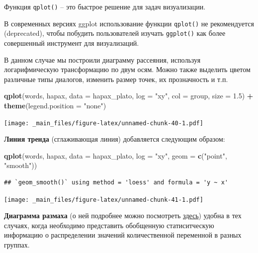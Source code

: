 \documentclass[
]{book}
\newenvironment{Shaded}{\begin{snugshade}}{\end{snugshade}}
\newcommand{\AttributeTok}[1]{\textcolor[rgb]{0.13,0.29,0.53}{#1}}
\newcommand{\FloatTok}[1]{\textcolor[rgb]{0.00,0.00,0.81}{#1}}
\newcommand{\FunctionTok}[1]{\textcolor[rgb]{0.13,0.29,0.53}{\textbf{#1}}}
\newcommand{\NormalTok}[1]{#1}
\newcommand{\SpecialCharTok}[1]{\textcolor[rgb]{0.81,0.36,0.00}{\textbf{#1}}}
\newcommand{\StringTok}[1]{\textcolor[rgb]{0.31,0.60,0.02}{#1}}
\theoremstyle{definition}
\theoremstyle{definition}
\theoremstyle{definition}
\theoremstyle{definition}
\theoremstyle{remark}
\begin{document}
Функция \texttt{qplot()} -- это быстрое решение для задач визуализации.

В современных версиях ggplot использование функции \texttt{qplot()} не рекомендуется (deprecated), чтобы побудить пользователей изучать \texttt{ggplot()} как более совершенный инструмент для визуализаций.

В данном случае мы построили диаграмму рассеяния, используя логарифмическую трансформацию по двум осям. Можно также выделить цветом различные типы диалогов, изменить размер точек, их прозначность и т.п.

\begin{Shaded}
\begin{Highlighting}[]
\FunctionTok{qplot}\NormalTok{(words, hapax, }\AttributeTok{data =}\NormalTok{ hapax\_plato, }\AttributeTok{log =} \StringTok{"xy"}\NormalTok{, }\AttributeTok{col =}\NormalTok{ group, }\AttributeTok{size =} \FloatTok{1.5}\NormalTok{) }\SpecialCharTok{+} \FunctionTok{theme}\NormalTok{(}\AttributeTok{legend.position =} \StringTok{"none"}\NormalTok{)}
\end{Highlighting}
\end{Shaded}

\texttt{[image: \_main\_files/figure-latex/unnamed-chunk-40-1.pdf]}

\textbf{Линия тренда} (сглаживающая линия) добавляется следующим образом:

\begin{Shaded}
\begin{Highlighting}[]
\FunctionTok{qplot}\NormalTok{(words, hapax, }\AttributeTok{data =}\NormalTok{ hapax\_plato, }\AttributeTok{log =} \StringTok{"xy"}\NormalTok{, }\AttributeTok{geom =} \FunctionTok{c}\NormalTok{(}\StringTok{"point"}\NormalTok{, }\StringTok{"smooth"}\NormalTok{))}
\end{Highlighting}
\end{Shaded}

\begin{verbatim}
## `geom_smooth()` using method = 'loess' and formula = 'y ~ x'
\end{verbatim}

\texttt{[image: \_main\_files/figure-latex/unnamed-chunk-41-1.pdf]}

\textbf{Диаграмма размаха} (о ней подробнее можно посмотреть \href{https://vk.com/video_ext.php?oid=-211800158\&id=456239229\&hash=7e1bc800e53df22c\&hd=2}{здесь}) удобна в тех случаях, когда необходимо представить обобщенную статиситческую информацию о распределении значений количественной переменной в разных группах.
\end{document}
